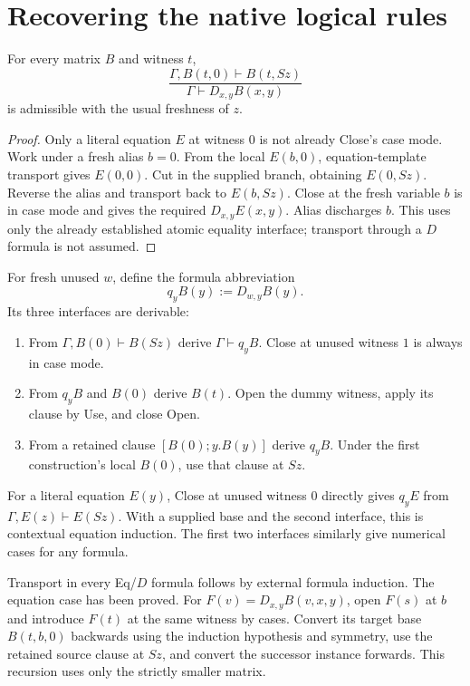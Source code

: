 \section{Recovering the native logical rules}
\label{sec:rp-logic}

\begin{lemma}
\label{lem:rp-case}
For every matrix $B$ and witness $t$,
\[
 \frac{\Gamma,B(t,0)\vdash B(t,Sz)}
      {\Gamma\vdash D_{x,y}B(x,y)}
\]
is admissible with the usual freshness of $z$.
\end{lemma}
\begin{proof}
Only a literal equation $E$ at witness $0$ is not already Close's case
mode.  Work under a fresh alias $b=0$.  From the local $E(b,0)$,
equation-template transport gives $E(0,0)$.  Cut in the supplied branch,
obtaining $E(0,Sz)$.  Reverse the alias and transport back to
$E(b,Sz)$.  Close at the fresh variable $b$ is in case mode and gives
the required $D_{x,y}E(x,y)$.  Alias discharges $b$.
This uses only the already established atomic equality interface;
transport through a $D$ formula is not assumed.
\end{proof}

For fresh unused $w$, define the formula abbreviation
\[
 q_yB(y):=D_{w,y}B(y).
\]
Its three interfaces are derivable:
\begin{enumerate}
\item From $\Gamma,B(0)\vdash B(Sz)$ derive $\Gamma\vdash q_yB$.
      Close at unused witness $1$ is always in case mode.
\item From $q_yB$ and $B(0)$ derive $B(t)$.  Open the dummy witness,
      apply its clause by Use, and close Open.
\item From a retained clause $[B(0);y.B(y)]$ derive $q_yB$.  Under
      the first construction's local $B(0)$, use that clause at $Sz$.
\end{enumerate}
For a literal equation $E(y)$, Close at unused witness $0$ directly
gives $q_yE$ from $\Gamma,E(z)\vdash E(Sz)$.  With a supplied base
and the second interface, this is contextual equation induction.
The first two interfaces similarly give numerical cases for any formula.

Transport in every Eq/$D$ formula follows by external formula induction.
The equation case has been proved.  For $F(v)=D_{x,y}B(v,x,y)$, open
$F(s)$ at $b$ and introduce $F(t)$ at the same witness by cases.
Convert its target base $B(t,b,0)$ backwards using the induction
hypothesis and symmetry, use the retained source clause at $Sz$, and
convert the successor instance forwards.  This recursion uses only the
strictly smaller matrix.

